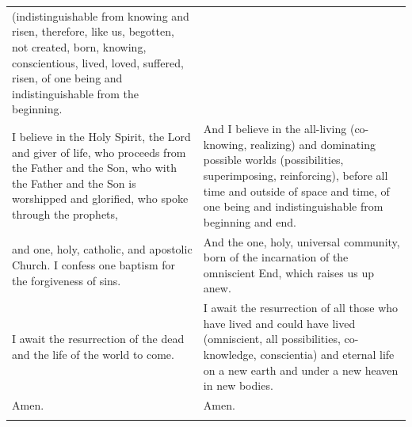 \documentclass[
  ngerman,
]{article}
\begin{document}
\begin{longtable}[]{@{}
  >{\raggedright\arraybackslash}p{}
  >{\raggedright\arraybackslash}p{}@{}}
\begin{minipage}[b]{\linewidth}
(indistinguishable from knowing and risen, therefore, like us, begotten,
not created, born, knowing, conscientious, lived, loved, suffered,
risen, of one being and indistinguishable from the beginning.
\end{minipage} \\
\begin{minipage}[b]{\linewidth}\raggedright
I believe in the Holy Spirit, the Lord and giver of life, who proceeds
from the Father and the Son, who with the Father and the Son is
worshipped and glorified, who spoke through the prophets,
\end{minipage} & \begin{minipage}[b]{\linewidth}\raggedright
And I believe in the all-living (co-knowing, realizing) and dominating
possible worlds (possibilities, superimposing, reinforcing), before all
time and outside of space and time, of one being and indistinguishable
from beginning and end.
\end{minipage} \\
\begin{minipage}[b]{\linewidth}\raggedright
and one, holy, catholic, and apostolic Church. I confess one baptism for
the forgiveness of sins.
\end{minipage} & \begin{minipage}[b]{\linewidth}\raggedright
And the one, holy, universal community, born of the incarnation of the
omniscient End, which raises us up anew.
\end{minipage} \\
\begin{minipage}[b]{\linewidth}\raggedright
I await the resurrection of the dead and the life of the world to come.
\end{minipage} & \begin{minipage}[b]{\linewidth}\raggedright
I await the resurrection of all those who have lived and could have
lived (omniscient, all possibilities, co-knowledge, conscientia) and
eternal life on a new earth and under a new heaven in new bodies.
\end{minipage} \\
\begin{minipage}[b]{\linewidth}\raggedright
Amen.
\end{minipage} & \begin{minipage}[b]{\linewidth}\raggedright
Amen.
\end{minipage} \\
\midrule\noalign{}
\endhead
\bottomrule\noalign{}
\endlastfoot
\end{longtable}
\end{document}
